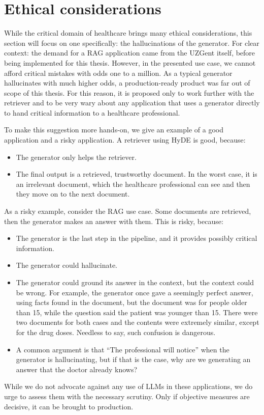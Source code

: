 \section{Ethical considerations}
\label{Ethical considerations}
While the critical domain of healthcare brings many ethical considerations, this section will focus on one specifically: the hallucinations of the generator. For clear context: the demand for a RAG application came from the UZGent itself, before being implemented for this thesis. However, in the presented use case, we cannot afford critical mistakes with odds one to a million. As a typical generator hallucinates with much higher odds, a production-ready product was far out of scope of this thesis. For this reason, it is proposed only to work further with the retriever and to be very wary about any application that uses a generator directly to hand critical information to a healthcare professional. 

To make this suggestion more hands-on, we give an example of a good application and a risky application. A retriever using HyDE is good, because:
\begin{itemize}
    \item The generator only helps the retriever.
    \item The final output is a retrieved, trustworthy document. In the worst case, it is an irrelevant document, which the healthcare professional can see and then they move on to the next document.
\end{itemize}
As a risky example, consider the RAG use case. Some documents are retrieved, then the generator makes an answer with them. This is risky, because:
\begin{itemize}
    \item The generator is the last step in the pipeline, and it provides possibly critical information.
    \item The generator could hallucinate.
    \item The generator could ground its answer in the context, but the context could be wrong. For example, the generator once gave a seemingly perfect answer, using facts found in the document, but the document was for people older than 15, while the question said the patient was younger than 15. There were two documents for both cases and the contents were extremely similar, except for the drug doses. Needless to say, such confusion is dangerous.
    \item A common argument is that ``The professional will notice'' when the generator is hallucinating, but if that is the case, why are we generating an answer that the doctor already knows?
\end{itemize}

While we do not advocate against any use of LLMs in these applications, we do urge to assess them with the necessary scrutiny. Only if objective measures are decisive, it can be brought to production.

